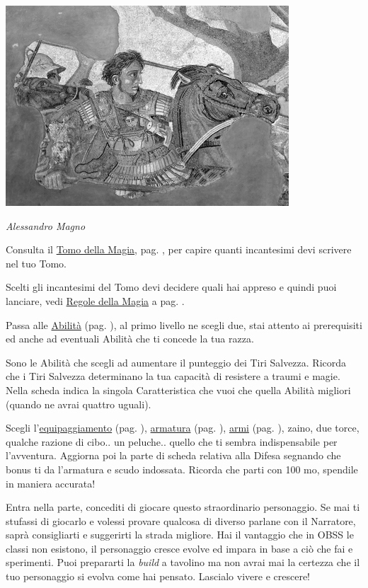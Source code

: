 \begin{multicols}{2}
\begin{center}
\includegraphics[width=0.85\linewidth]{immagini/Alexander_and_Bucephalus_-_Battle_of_Issus_mosaic.png}

\emph{Alessandro Magno}
\end{center}

Consulta il \hyperlink{tomocm1}{Tomo della Magia}, pag. \pageref{tomocm1}, per capire quanti incantesimi devi scrivere nel tuo Tomo.

Scelti gli incantesimi del Tomo devi decidere quali hai appreso e quindi puoi lanciare, vedi \hyperlink{incantesimicm1}{Regole della Magia} a pag. \pageref{incantesimicm1}.

Passa alle \hyperlink{abilita}{Abilità} (pag. \pageref{abilita}), al primo livello ne scegli due, stai attento ai prerequisiti ed anche ad eventuali Abilità che ti concede la tua razza.

Sono le Abilità che scegli ad aumentare il punteggio dei Tiri Salvezza. Ricorda che i Tiri Salvezza determinano la tua capacità di resistere a traumi e magie. Nella scheda indica la singola Caratteristica che vuoi che quella Abilità migliori (quando ne avrai quattro uguali).

Scegli l'\hyperlink{equipaggiamento}{equipaggiamento} (pag. \pageref{equipaggiamento}), \hyperlink{equipaggiamento.armature.scudi}{armatura} (pag. \pageref{equipaggiamentoarmature}), \hyperlink{equipaggiamento.armi}{armi} (pag. \pageref{equipaggiamentoarmi}), zaino, due torce, qualche razione di cibo.. un peluche.. quello che ti sembra indispensabile per l'avventura.
Aggiorna poi la parte di scheda relativa alla Difesa segnando che bonus ti da l'armatura e scudo indossata. Ricorda che parti con 100 mo, spendile in maniera accurata!

Entra nella parte, concediti di giocare questo straordinario personaggio. Se mai ti stufassi di giocarlo e volessi provare qualcosa di diverso parlane con il Narratore, saprà consigliarti e suggerirti la strada migliore.
Hai il vantaggio che in OBSS le classi non esistono, il personaggio cresce evolve ed impara in base a ciò che fai e sperimenti. Puoi prepararti la \emph{build} a tavolino ma non avrai mai la certezza che il tuo personaggio si evolva come hai pensato. Lascialo vivere e crescere!


\end{multicols}
